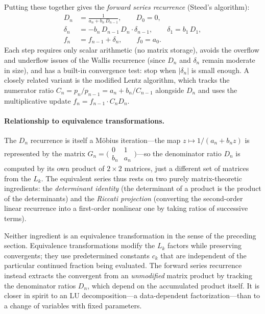 \documentclass{article}
\begin{document}
Putting these together gives the \emph{forward series recurrence} (Steed's algorithm):
\begin{equation}
  \begin{aligned}
    D_n &= \frac{1}{a_n + b_n\, D_{n-1}}, \qquad D_0 = 0, \\[4pt]
    \delta_n &= -b_n\, D_{n-1}\, D_n \cdot \delta_{n-1}, \qquad \delta_1 = b_1\, D_1, \\[4pt]
    f_n &= f_{n-1} + \delta_n, \qquad f_0 = a_0.
  \end{aligned}
\end{equation}
Each step requires only scalar arithmetic (no matrix storage), avoids the overflow and underflow issues of the Wallis recurrence (since $D_n$ and $\delta_n$ remain moderate in size), and has a built-in convergence test: stop when $|\delta_n|$ is small enough. A closely related variant is the modified Lentz algorithm, which tracks the numerator ratio $C_n = p_n/p_{n-1} = a_n + b_n/C_{n-1}$ alongside $D_n$ and uses the multiplicative update $f_n = f_{n-1} \cdot C_n D_n$.

\paragraph{Relationship to equivalence transformations.}
The $D_n$ recurrence is itself a M\"obius iteration---the map $z \mapsto 1/(a_n + b_n z)$ is represented by the matrix $G_n = \bigl(\begin{smallmatrix} 0 & 1 \\ b_n & a_n \end{smallmatrix}\bigr)$---so the denominator ratio $D_n$ is computed by its own product of $2 \times 2$ matrices, just a different set of matrices from the $L_k$. The equivalent series thus rests on two purely matrix-theoretic ingredients: the \emph{determinant identity} (the determinant of a product is the product of the determinants) and the \emph{Riccati projection} (converting the second-order linear recurrence into a first-order nonlinear one by taking ratios of successive terms).

Neither ingredient is an equivalence transformation in the sense of the preceding section. Equivalence transformations modify the $L_k$ factors while preserving convergents; they use predetermined constants $c_k$ that are independent of the particular continued fraction being evaluated. The forward series recurrence instead extracts the convergent from an \emph{unmodified} matrix product by tracking the denominator ratios $D_n$, which depend on the accumulated product itself. It is closer in spirit to an LU decomposition---a data-dependent factorization---than to a change of variables with fixed parameters.
\end{document}
